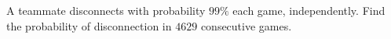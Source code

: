 A teammate disconnects with probability $99\%$ each game, independently. Find the probability of disconnection in $4629$ consecutive games.
